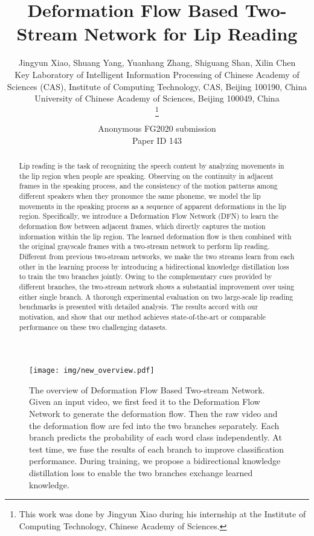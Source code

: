 \documentclass[a4paper, 10pt, conference]{ieeeconf}      \usepackage{FG2020}
\title{\LARGE \bf
Deformation Flow Based Two-Stream Network for Lip Reading
}
\author{\parbox{16cm}{\centering
    {\large Jingyun Xiao, Shuang Yang, Yuanhang Zhang, Shiguang Shan, Xilin Chen }\\
    {\normalsize
     Key Laboratory of Intelligent Information Processing of Chinese Academy of Sciences (CAS), Institute of Computing Technology, CAS, Beijing 100190, China\\
     University of Chinese Academy of Sciences, Beijing 100049, China
    }
    }
    \thanks{This work was done by Jingyun Xiao during his internship at the Institute of Computing Technology, Chinese Academy of Sciences.}}
\def\FGPaperID{143}
\begin{document}
\ifFGfinal
\thispagestyle{empty}
\pagestyle{empty}
\else
\author{Anonymous FG2020 submission\\ Paper ID \FGPaperID \\}
\pagestyle{plain}
\fi
\maketitle



\begin{abstract}

   Lip reading is the task of recognizing the speech content by analyzing movements in the lip region when people are speaking. 
Observing on the continuity in adjacent frames in the speaking process, and the consistency of the motion patterns among different speakers when they pronounce the same phoneme, we model the lip movements in the speaking process as a sequence of apparent deformations in the lip region. 
Specifically, we introduce a Deformation Flow Network (DFN) to learn the deformation flow between adjacent frames, which directly captures the motion information within the lip region. The learned deformation flow is then combined with the original grayscale frames with a two-stream network to perform lip reading. Different from previous two-stream networks, we make the two streams learn from each other in the learning process by introducing a bidirectional knowledge distillation loss to train the two branches jointly. Owing to the complementary cues provided by different branches, the two-stream network shows a substantial improvement over using either single branch.
A thorough experimental evaluation on two large-scale lip reading benchmarks is presented with detailed analysis. The results accord with our motivation, and show that our method achieves state-of-the-art or comparable performance on these two challenging datasets. 

\end{abstract}


\begin{figure*}
   \centering
   \texttt{[image: img/new\_overview.pdf]}
   \caption{The overview of Deformation Flow Based Two-stream Network. Given an input video, we first feed it to the Deformation Flow Network to generate the deformation flow.  Then the raw video and the deformation flow are fed into the two branches separately. Each branch predicts the probability of each word class independently. At test time, we fuse the results of each branch to improve classification performance. During training, we propose a bidirectional knowledge distillation loss to enable the two branches exchange learned knowledge.}
   \label{fig:overview}
   \vspace{-0.4cm}
   \end{figure*}
\end{document}
